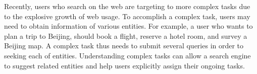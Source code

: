Recently, users who search on the web are targeting to more complex tasks due to the explosive growth of web usage. To accomplish a complex task, users may need to obtain information of various entities. For example, a user who wants to plan a trip to Beijing, should book a flight, reserve a hotel room, and survey a Beijing map. A complex task thus needs to submit several queries in order to seeking each of entities. Understanding complex tasks can allow a search engine to suggest related entities and help users explicitly assign their ongoing tasks.
